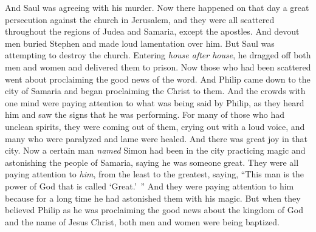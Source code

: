 \begin{biblechapter} %
 And Saul was agreeing with his murder. Now there happened on that day a great persecution against the church in Jerusalem, and they were all scattered throughout the regions of Judea and Samaria, except the apostles.
\verse And devout men buried Stephen and made loud lamentation over him.
\verse But Saul was attempting to destroy the church. Entering \textit{house after house}, he dragged off both men and women and delivered them to prison.
 Now those who had been scattered went about proclaiming the good news of the word.
\verse And Philip came down to the city of Samaria and began proclaiming the Christ to them.
\verse And the crowds with one mind were paying attention to what was being said by Philip, as they heard him and saw the signs that he was performing.
\verse For many of those who had unclean spirits, they were coming out of them, crying out with a loud voice, and many who were paralyzed and lame were healed.
\verse And there was great joy in that city.
 Now a certain man \textit{named} Simon had been in the city practicing magic and astonishing the people of Samaria, saying he was someone great.
\verse They were all paying attention to \textit{him}, from the least to the greatest, saying, “This man is the power of God that is called ‘Great.’ ”
\verse And they were paying attention to him because for a long time he had astonished them with his magic.
\verse But when they believed Philip as he was proclaiming the good news about the kingdom of God and the name of Jesus Christ, both men and women were being baptized.

\end{biblechapter}
